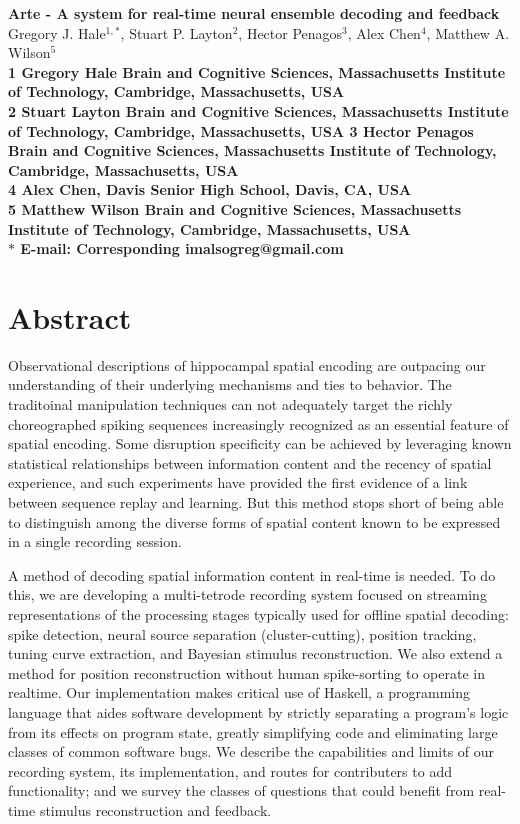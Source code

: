 \documentclass[10pt]{article}
\date{}
\begin{document}
\begin{flushleft}
{\Large
\textbf{Arte - A system for real-time neural ensemble decoding and feedback}
}
\\
Gregory J. Hale$^{1,\ast}$, 
Stuart P. Layton$^{2}$, 
Hector Penagos$^{3}$, 
Alex Chen$^{4}$,
Matthew A. Wilson$^{5}$
\\
\bf{1} Gregory Hale Brain and Cognitive Sciences, Massachusetts Institute of Technology, Cambridge, Massachusetts, USA
\\
\bf{2} Stuart Layton Brain and Cognitive Sciences, Massachusetts Institute of Technology, Cambridge, Massachusetts, USA
\bf{3} Hector Penagos Brain and Cognitive Sciences, Massachusetts Institute of Technology, Cambridge, Massachusetts, USA
\\
\bf{4} Alex Chen, Davis Senior High School, Davis, CA, USA
\\
\bf{5} Matthew Wilson Brain and Cognitive Sciences, Massachusetts Institute of Technology, Cambridge, Massachusetts, USA
\\
$\ast$ E-mail: Corresponding imalsogreg@gmail.com
\end{flushleft}

\section*{Abstract}
Observational descriptions of hippocampal spatial encoding are outpacing our understanding of their underlying mechanisms and ties to behavior. The traditoinal manipulation techniques can not adequately target the richly choreographed spiking sequences increasingly recognized as an essential feature of spatial encoding. Some disruption specificity can be achieved by leveraging known statistical relationships between information content and the recency of spatial experience, and such experiments have provided the first evidence of a link between sequence replay and learning.  But this method stops short of being able to distinguish among the diverse forms of spatial content known to be expressed in a single recording session.

A method of decoding spatial information content in real-time is needed. To do this, we are developing a multi-tetrode recording system focused on streaming representations of the processing stages typically used for offline spatial decoding: spike detection, neural source separation (cluster-cutting), position tracking, tuning curve extraction, and Bayesian stimulus reconstruction. We also extend a method for position reconstruction without human spike-sorting to operate in realtime. Our implementation makes critical use of Haskell, a programming language that aides software development by strictly separating a program's logic from its effects on program state, greatly simplifying code and eliminating large classes of common software bugs.  We describe the capabilities and limits of our recording system, its implementation, and routes for contributers to add functionality; and we survey the classes of questions that could benefit from real-time stimulus reconstruction and feedback.
\end{document}
